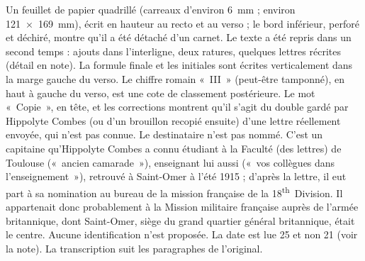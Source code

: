 Un feuillet de papier quadrillé (carreaux d'environ 6~mm ; environ 121~×~169~mm), écrit en hauteur au recto et au verso ; le bord inférieur, perforé et déchiré, montre qu'il a été détaché d'un carnet. Le texte a été repris dans un second temps : ajouts dans l'interligne, deux ratures, quelques lettres récrites (détail en note). La formule finale et les initiales sont écrites verticalement dans la marge gauche du verso. Le chiffre romain «~III~» (peut-être tamponné), en haut à gauche du verso, est une cote de classement postérieure. Le mot «~Copie~», en tête, et les corrections montrent qu'il s'agit du double gardé par Hippolyte Combes (ou d'un brouillon recopié ensuite) d'une lettre réellement envoyée, qui n'est pas connue. Le destinataire n'est pas nommé. C'est un capitaine qu'Hippolyte Combes a connu étudiant à la Faculté (des lettres) de Toulouse («~ancien camarade~»), enseignant lui aussi («~vos collègues dans l'enseignement~»), retrouvé à Saint-Omer à l'été 1915 ; d'après la lettre, il eut part à sa nomination au bureau de la mission française de la 18\textsuperscript{th}~Division. Il appartenait donc probablement à la Mission militaire française auprès de l'armée britannique, dont Saint-Omer, siège du grand quartier général britannique, était le centre. Aucune identification n'est proposée. La date est lue 25 et non 21 (voir la note). La transcription suit les paragraphes de l'original.

